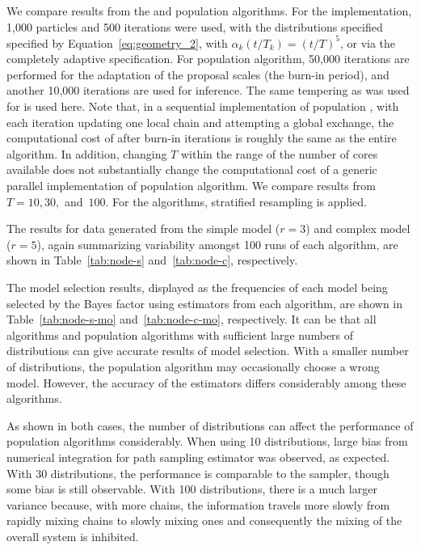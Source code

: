 We compare results from the \smc[2] and population \mcmc algorithms. For the \smc implementation, 1,000 particles and 500 iterations were used, with the distributions specified specified by Equation~\eqref{eq:geometry_2}, with $\alpha_k(t/T_k) = (t/T)^5$, or via the completely adaptive specification. For population \mcmc algorithm, 50,000 iterations are performed for the adaptation of the proposal scales (the burn-in period), and another 10,000 iterations are used for inference. The same tempering as was used for \smc is used here. Note that, in a sequential implementation of population \mcmc, with each iteration updating one local chain and attempting a global exchange, the computational cost of after burn-in iterations is roughly the same as the entire \smc algorithm. In addition, changing $T$ within the range of the number of cores available does not substantially change the computational cost of a generic parallel implementation of population \mcmc algorithm. We compare results from $T = 10,30,$ and~$100$. For the \smc algorithms, stratified resampling is applied.

The results for data generated from the simple model ($r = 3$) and complex model ($r = 5$), again summarizing variability amongst 100 runs of each algorithm, are shown in Table~\ref{tab:node-s} and~\ref{tab:node-c}, respectively.
\begin{draftpar}
The model selection results, displayed as the frequencies of each model being selected by the Bayes factor using estimators from each algorithm, are shown in Table~\ref{tab:node-s-mo} and~\ref{tab:node-c-mo}, respectively. It can be  that all \smc algorithms and population \mcmc algorithms with sufficient large numbers of distributions can give accurate results of model selection. With a smaller number of distributions, the population \mcmc algorithm may occasionally choose a wrong model. However, the accuracy of the estimators differs considerably among these algorithms.
\end{draftpar}

\begingroup
\afterpage{\clearpage}
\endgroup

As shown in both cases, the number of distributions can affect the performance of population \mcmc algorithms considerably. When using 10 distributions, large bias from numerical integration for path sampling estimator was observed, as expected. With 30 distributions, the performance is comparable to the \smc[2] sampler, though some bias is still observable. With 100 distributions, there is a much larger variance because, with more chains, the information travels more slowly from rapidly mixing chains to slowly mixing ones and consequently the mixing of the overall system is inhibited.

